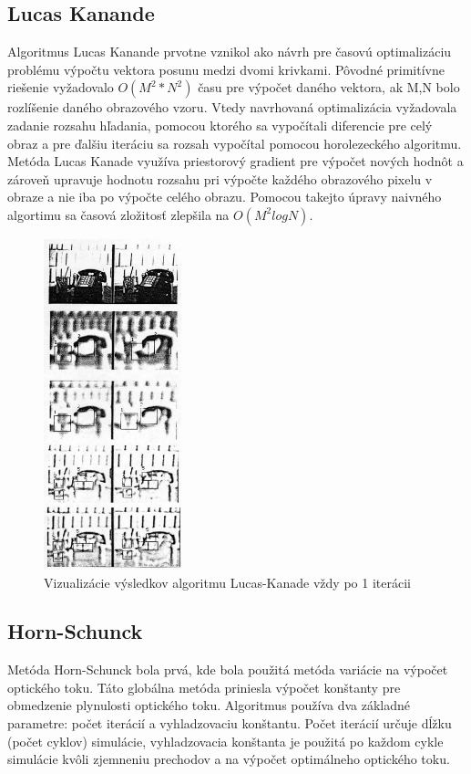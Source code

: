 \subsection{Lucas Kanande}
Algoritmus Lucas Kanande\cite{lucas-kanade} prvotne vznikol ako návrh pre časovú optimalizáciu problému výpočtu vektora posunu medzi dvomi krivkami.
Pôvodné primitívne riešenie vyžadovalo \begin{math} O(M^2 * N^2) \end{math} času pre výpočet daného vektora, ak M,N bolo rozlíšenie daného obrazového vzoru.
Vtedy navrhovaná optimalizácia vyžadovala zadanie rozsahu hľadania, pomocou ktorého sa vypočítali diferencie pre celý obraz a pre ďalšiu iteráciu sa rozsah vypočítal pomocou horolezeckého algoritmu.
Metóda Lucas Kanade využíva priestorový gradient pre výpočet nových hodnôt a zároveň upravuje hodnotu rozsahu pri výpočte každého obrazového pixelu v obraze a nie iba po výpočte celého obrazu.
Pomocou takejto úpravy naivného algortimu sa časová zložitosť zlepšila na \begin{math} O(M^2 log N) \end{math}\cite{lucas-kanade}.

\begin{figure}[H]
  \centering
  \includegraphics[width=4cm]{pics/lukas-kanade.jpg}
  \caption{Vizualizácie výsledkov algoritmu Lucas-Kanade vždy po 1 iterácii\cite{lucas-kanade}}
\end{figure}
\vspace{10mm}

\subsection{Horn-Schunck}
Metóda Horn-Schunck\cite{hs-original} bola prvá, kde bola použitá metóda variácie na výpočet optického toku.
Táto globálna metóda priniesla výpočet  konštanty pre obmedzenie plynulosti optického toku.
Algoritmus používa dva základné parametre: počet iterácií a vyhladzovaciu konštantu.
Počet iterácií určuje dĺžku (počet cyklov) simulácie, vyhladzovacia konštanta je použitá po každom cykle simulácie kvôli zjemneniu prechodov a na výpočet optimálneho optického toku.

